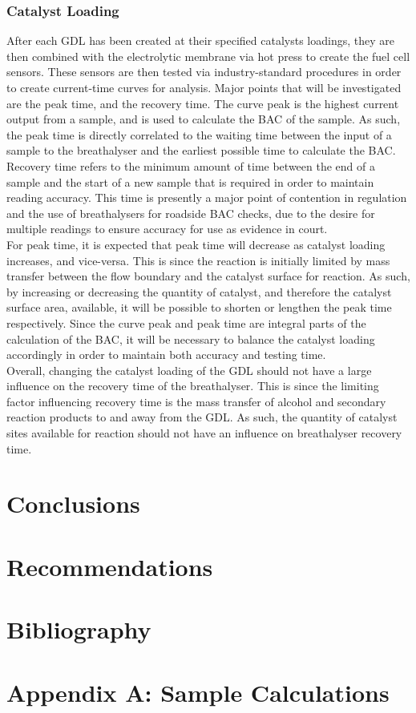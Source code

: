 \documentclass{article}
\begin{document}
    	\subsubsection{Catalyst Loading}
      After each GDL has been created at their specified catalysts loadings, they are then combined with the electrolytic membrane via hot press to create the fuel cell sensors. These sensors are then tested via industry-standard procedures in order to create current-time curves for analysis. Major points that will be investigated are the peak time, and the recovery time. The curve peak is the highest current output from a sample, and is used to calculate the BAC of the sample. As such, the peak time is directly correlated to the waiting time between the input of a sample to the breathalyser and the earliest possible time to calculate the BAC. Recovery time refers to the minimum amount of time between the end of a sample and the start of a new sample that is required in order to maintain reading accuracy. This time is presently a major point of contention in regulation and the use of breathalysers for roadside BAC checks, due to the desire for multiple readings to ensure accuracy for use as evidence in court.\\
      For peak time, it is expected that peak time will decrease as catalyst loading increases, and vice-versa. This is since the reaction is initially limited by mass transfer between the flow boundary and the catalyst surface for reaction. As such, by increasing or decreasing the quantity of catalyst, and therefore the catalyst surface area, available, it will be possible to shorten or lengthen the peak time respectively. Since the curve peak and peak time are integral parts of the calculation of the BAC, it will be necessary to balance the catalyst loading accordingly in order to maintain both accuracy and testing time.\\
      Overall, changing the catalyst loading of the GDL should not have a large influence on the recovery time of the breathalyser. This is since the limiting factor influencing recovery time is the mass transfer of alcohol and secondary reaction products to and away from the GDL. As such, the quantity of catalyst sites available for reaction should not have an influence on breathalyser recovery time.
    \section{Conclusions}
	\section{Recommendations}
	\section{Bibliography}
	\section{Appendix A: Sample Calculations}
\end{document}

